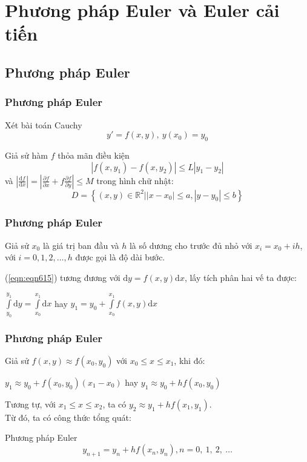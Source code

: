 \section{Phương pháp Euler và Euler cải tiến}

\begin{frame}
	\subsection{Phương pháp Euler}
	\frametitle{Phương pháp Euler}

	Xét bài toán Cauchy
	\begin{equation}\label{eqn:eqn615}
		y'=f(x,y),~y(x_0)=y_0
	\end{equation}

	Giả sử hàm $f$ thỏa mãn điều kiện $$|f(x,y_1)-f(x,y_2)|\leqslant L|{y_1}-{y_2}|$$
	và $\left|\frac{\mathrm{d}f}{\mathrm{d}x}\right|=\left|\frac{\partial f}{\partial x}+f\frac{\partial f}{\partial y}\right|\leqslant M$ trong hình chữ nhật:
	$$D=\left\{(x,y)\in\mathbb{R}^2\Big||x-x_0|\leqslant a,|y-y_0|\leqslant b\right\}$$
\end{frame}
\begin{frame}
	\frametitle{Phương pháp Euler}
	Giả sử $x_0$ là giá trị ban đầu và $h$ là số dương cho trước đủ nhỏ với $x_i=x_0+ih$, với $i=0, 1, 2, \ldots, h$ được gọi là độ dài bước.\par
	(\ref{eqn:eqn615}) tương đương với $\mathrm{d}y=f\left(x,y\right)\mathrm{d}x$, lấy tích phân hai vế ta được:
	\begin{center}
		$\int\limits_{y_0}^{y_1}\mathrm{d}y=\int\limits_{x_0}^{x_1}\mathrm{d}x$ hay $y_1=y_0+\int\limits_{x_0}^{x_1} f(x,y)\mathrm{d}x$
	\end{center}
\end{frame}
\begin{frame}
	\frametitle{Phương pháp Euler}
	Giả sử $f(x,y)\approx f\left(x_0,y_0\right)$ với $x_0\leqslant x\leqslant x_1$, khi đó:
	\begin{center}
		$y_1\approx y_0+f\left(x_0,y_0\right)\left(x_1-x_0\right)$ hay $y_1\approx y_0+hf\left(x_0,y_0\right)$
	\end{center}
	Tương tự, với $x_1\leqslant x\leqslant x_2$, ta có $y_2\approx y_1+hf\left(x_1,y_1\right)$.\\
	Từ đó, ta có công thức tổng quát:
	\begin{block}{Phương pháp Euler}
		\begin{equation}\label{eqn:eqn616}
			y_{n+1}=y_n+hf\left(x_n,y_n\right), n=0,~1,~2,~\ldots
		\end{equation}
	\end{block}
\end{frame}
